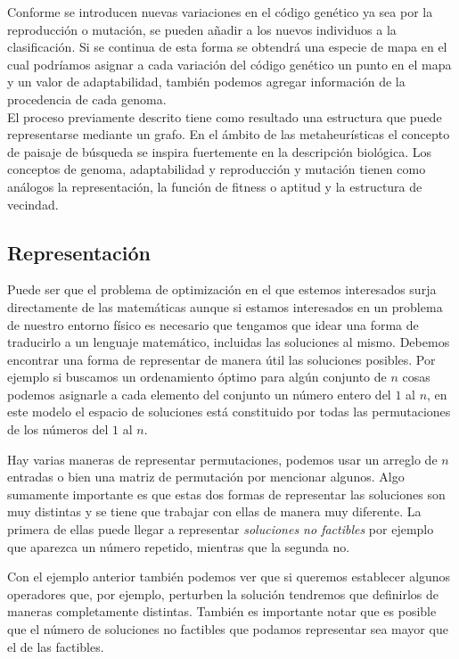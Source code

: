 Conforme se introducen nuevas variaciones en el código genético ya sea por la reproducción o mutación, se pueden añadir a los nuevos individuos a la clasificación. Si se continua de esta forma se obtendrá una especie de mapa en el cual podríamos asignar a cada variación del código genético un punto en el mapa y un valor de adaptabilidad, también podemos agregar información de la procedencia de cada genoma.\\

El proceso previamente descrito tiene como resultado una estructura que puede representarse mediante un grafo. En el ámbito de las metaheurísticas el concepto de paisaje de búsqueda se inspira fuertemente en la descripción biológica. Los conceptos de genoma, adaptabilidad y reproducción y mutación tienen como análogos la representación, la función de fitness o aptitud y la estructura de vecindad.   

\subsection{Representación}
Puede ser que el problema de optimización en el que estemos interesados surja directamente de las matemáticas aunque si estamos interesados en un problema de nuestro entorno físico es necesario que tengamos que idear una forma de traducirlo a un lenguaje matemático, incluidas las soluciones al mismo. Debemos encontrar una forma de representar de manera útil las soluciones posibles.
Por ejemplo si buscamos un ordenamiento óptimo para algún conjunto de $n$ cosas podemos asignarle a cada elemento del conjunto un número entero del $1$ al $n$, en este modelo el espacio de soluciones está constituido por todas las permutaciones de los números del $1$ al $n$. 

Hay varias maneras de representar permutaciones, podemos usar un arreglo de $n$ entradas o bien una matriz de permutación por mencionar algunos. Algo sumamente importante es que estas dos formas de representar las soluciones son muy distintas y se tiene que trabajar con ellas de manera muy diferente. La primera de ellas puede llegar a representar \textit{soluciones no factibles} por ejemplo que aparezca un número repetido, mientras que la segunda no.

Con el ejemplo anterior también podemos ver que si queremos establecer algunos operadores que, por ejemplo, perturben la solución tendremos que definirlos de maneras completamente distintas. También es importante notar que es posible que el número de soluciones no factibles que podamos representar sea mayor que el de las factibles.

